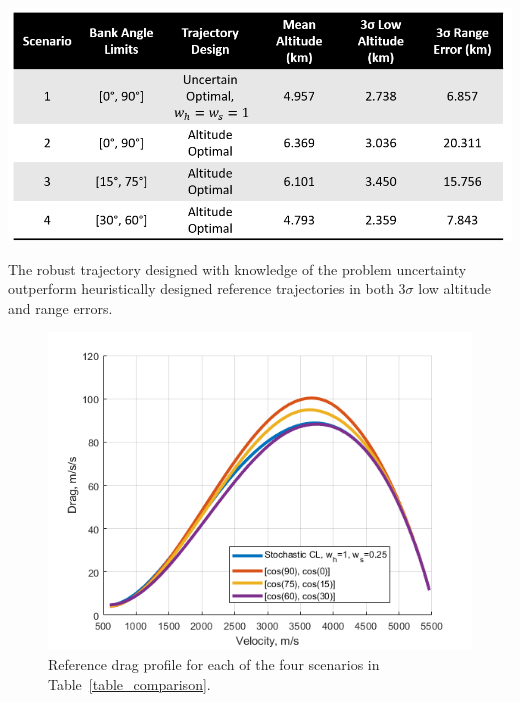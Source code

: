 \documentclass[journal ]{new-aiaa}
\begin{document}
\begin{table}[h!]
	\centering
	\includegraphics[width=1\textwidth]{ddp/comparison_table}
	\caption{The robust trajectory designed with knowledge of the problem uncertainty outperform heuristically designed reference trajectories in both $3\sigma$ low altitude and range errors.}
	\label{table_comparison}
\end{table}
\begin{figure}[h!]
	\centering
	\includegraphics[width=1\textwidth]{ddp/matlab/ComparisonDrag}
	\caption{Reference drag profile for each of the four scenarios in Table~\ref{table_comparison}.}
	\label{fig_drag}
\end{figure}
\end{document}
